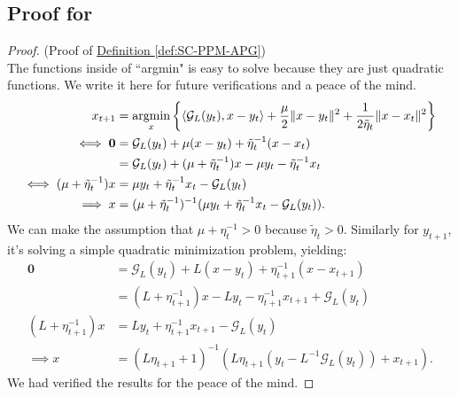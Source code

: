 \documentclass[12pt]{article}
\begin{document}
    \subsection{Proof for \SCPPMAPG}\label{proof:derivations-SC-PPM-AGP}
        \begin{proof}
            (Proof of 
            \hyperref[def:SC-PPM-APG]
            {Definition \ref*{def:SC-PPM-APG}})
            \\
            The functions inside of ``argmin" is easy to solve because they are just quadratic functions. 
            We write it here for future verifications and a peace of the mind. 
            \begin{align*}
                x_{t + 1} &= \mathop{\rm argmin}\limits_{x}\left\lbrace
                    \langle \mathcal G_L(y_t), x - y_t\rangle 
                    + 
                    \frac{\mu}{2}\Vert x - y_t\Vert^2 +  
                    \frac{1}{2\tilde \eta_{t}}\Vert x - x_t\Vert^2
                \right\rbrace
                \\
                \iff 
                \mathbf 0 & = 
                \mathcal G_L(y_t) + \mu(x - y_t) + \tilde \eta_{t}^{-1}(x - x_t)
                \\
                &= 
                \mathcal G_L(y_t) + (\mu + \tilde \eta_{t}^{-1}) x - \mu y_t - \tilde \eta_{t}^{-1} x_t
                \\
                \iff 
                (\mu + \tilde \eta_{t}^{-1})x 
                &= 
                \mu y_t + \tilde \eta_{t}^{-1} x_t - \mathcal G_L(y_t)
                \\
                \implies 
                x &= (\mu + \tilde \eta_{t}^{-1})^{-1 }
                (\mu y_t + \tilde \eta_{t}^{-1} x_t - \mathcal G_L(y_t)). 
            \end{align*}
            We can make the assumption that $\mu + \eta_{t}^{-1} > 0$ because $\tilde\eta_t > 0$. 
            Similarly for $y_{t + 1}$, it's solving a simple quadratic minimization problem, yielding: 
            \begin{align*}
                \mathbf 0 &= \mathcal G_L(y_t) + L(x - y_t) + \eta_{t + 1}^{-1}(x - x_{t + 1})
                \\
                &= (L + \eta_{t + 1}^{-1})x - L y_t - \eta_{t + 1}^{-1}x_{t + 1} + \mathcal G_L(y_t) 
                \\
                (L + \eta_{t + 1}^{-1})x &= 
                Ly_t + \eta_{t + 1}^{-1} x_{t + 1} - \mathcal G_L(y_t)
                \\
                \implies 
                x &= 
                (L\eta_{t + 1} + 1)^{-1}(L\eta_{t + 1}(y_t - L^{-1}\mathcal G_L(y_t)) + x_{t + 1}). 
            \end{align*}
            We had verified the results for the peace of the mind. 
        \end{proof}
\end{document}
